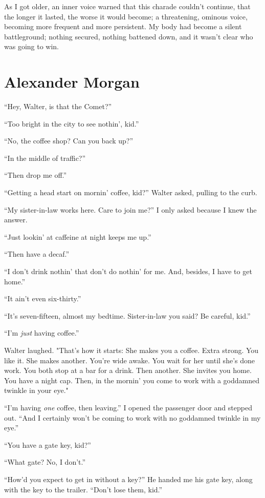As I got older, an inner voice warned that this charade couldn't
continue, that the longer it lasted, the worse it would become; a
threatening, ominous voice, becoming more frequent and more persistent.
My body had become a silent battleground; nothing secured, nothing
battened down, and it wasn't clear who was going to win.

\chapter{Alexander Morgan}

\titlemark

``Hey, Walter, is that the Comet?''

``Too bright in the city to see nothin', kid.''

``No, the coffee shop? Can you back up?''

``In the middle of traffic?''

``Then drop me off.''

``Getting a head start on mornin' coffee, kid?'' Walter asked, pulling
to the curb.

``My sister-in-law works here. Care to join me?'' I only asked because I
knew the answer.

``Just lookin' at caffeine at night keeps me up.''

``Then have a decaf.''

``I don't drink nothin' that don't do nothin' for me. And, besides, I
have to get home.''

``It ain't even six-thirty.''

``It's seven-fifteen, almost my bedtime. Sister-in-law you said? Be
careful, kid.''

``I'm \emph{just} having coffee.''

Walter laughed. "That's how it starts: She makes you a coffee. Extra
strong. You like it. She makes another. You're wide awake. You wait for
her until she's done work. You both stop at a bar for a drink. Then
another. She invites you home. You have a night cap. Then, in the
mornin' you come to work with a goddamned twinkle in your eye."

``I'm having \emph{one} coffee, then leaving.'' I opened the passenger
door and stepped out. ``And I certainly won't be coming to work with no
goddamned twinkle in my eye.''

``You have a gate key, kid?''

``What gate? No, I don't.''

``How'd you expect to get in without a key?'' He handed me his gate key,
along with the key to the trailer. ``Don't lose them, kid.''

